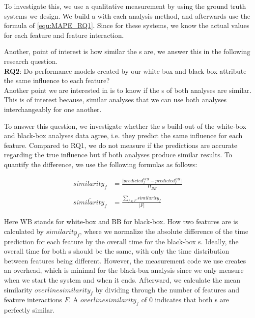 To investigate this, we use a qualitative measurement by using the ground truth systems we design. 
We build a {\perfInfluenceModel} with each analysis method, and afterwards use the formula of \autoref{equ:MAPE_RQ1}. 
Since for these systems, we know the actual values for each feature and feature interaction.

Another, point of interest is how similar the {\perfInfluenceModel}s are, we answer this in the following research question.\\

\noindent \textbf{RQ2}: Do performance models created by our white-box and black-box attribute the same influence to each feature?\\

Another point we are interested in is to know if the {\perfInfluenceModel}s of both analyses are similar.
This is of interest because, similar analyses that we can use both analyses interchangeably for one another.

To answer this question, we investigate whether the {\perfInfluenceModel}s build-out of the white-box and black-box analyses data agree, i.e.
they predict the same influence for each feature. 
Compared to RQ1, we do not measure if the predictions are accurate regarding the true influence but if both analyses produce similar results. 
To quantify the difference, we use the following formulas as follows:

\begin{align}
    similarity_f &= \frac{\lvert predicted^{WB}_{f} - predicted^{BB}_{f} \rvert}{\Pi_{BB}} \label{equ:APE_RQ1} \\ \nonumber \\
    \overline{similarity_f}  &=  \frac{\sum_{f \in F} similarity_f}{\lvert F \rvert} \label{equ:MAPE_RQ1}
\end{align}

Here WB stands for white-box and BB for black-box. How two features are is calculated by $similarity_f$, 
where we normalize the absolute difference of the time prediction for each feature by the overall time for the black-box {\perfInfluenceModel}s. 
Ideally, the overall time for both {\perfInfluenceModel}s should be the same, with only the time distribution between features being different. 
However, the measurement code we use creates an overhead, which is minimal for the black-box analysis since we only measure when we start the system and when it ends.
Afterward, we calculate the mean similarity $overline{similarity_f}$ by dividing through the number of features and feature interactions $F$. 
A $overline{similarity_f}$ of 0 indicates that both {\perfInfluenceModel}s are perfectly similar.


